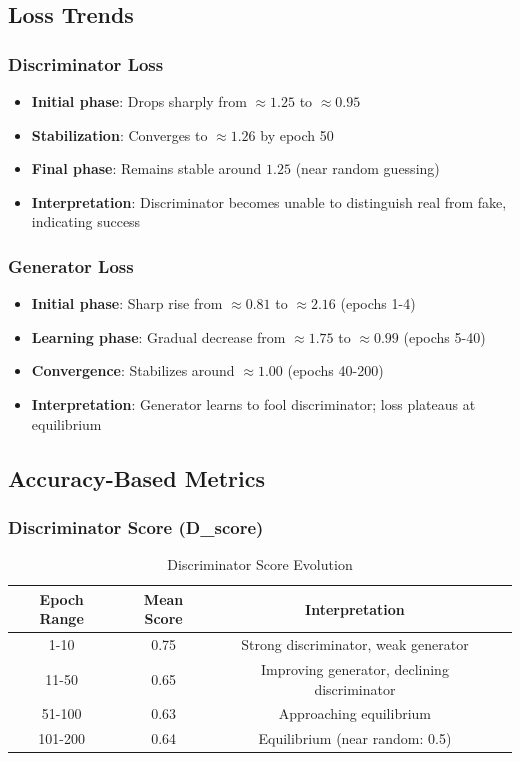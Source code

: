 \documentclass[12pt,a4paper]{article}
\begin{document}
\subsection{Loss Trends}

\subsubsection{Discriminator Loss}
\begin{itemize}
    \item \textbf{Initial phase}: Drops sharply from $\approx 1.25$ to $\approx 0.95$
    \item \textbf{Stabilization}: Converges to $\approx 1.26$ by epoch 50
    \item \textbf{Final phase}: Remains stable around $1.25$ (near random guessing)
    \item \textbf{Interpretation}: Discriminator becomes unable to distinguish real from fake, indicating success
\end{itemize}

\subsubsection{Generator Loss}
\begin{itemize}
    \item \textbf{Initial phase}: Sharp rise from $\approx 0.81$ to $\approx 2.16$ (epochs 1-4)
    \item \textbf{Learning phase}: Gradual decrease from $\approx 1.75$ to $\approx 0.99$ (epochs 5-40)
    \item \textbf{Convergence}: Stabilizes around $\approx 1.00$ (epochs 40-200)
    \item \textbf{Interpretation}: Generator learns to fool discriminator; loss plateaus at equilibrium
\end{itemize}

\subsection{Accuracy-Based Metrics}

\subsubsection{Discriminator Score (D\_score)}
\begin{table}[H]
    \centering
    \begin{tabular}{|c|c|c|c|}
        \hline
        \textbf{Epoch Range} & \textbf{Mean Score} & \textbf{Interpretation} \\
        \hline
        1-10 & 0.75 & Strong discriminator, weak generator \\
        \hline
        11-50 & 0.65 & Improving generator, declining discriminator \\
        \hline
        51-100 & 0.63 & Approaching equilibrium \\
        \hline
        101-200 & 0.64 & Equilibrium (near random: 0.5) \\
        \hline
    \end{tabular}
    \caption{Discriminator Score Evolution}
\end{table}
\end{document}
